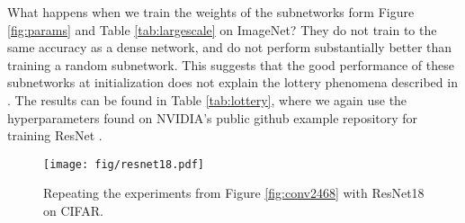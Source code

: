 \documentclass[10pt,twocolumn,letterpaper]{article}
\begin{document}
What happens when we train the weights of the subnetworks form Figure \ref{fig:params} and Table \ref{tab:largescale} on ImageNet? They do not train to the same accuracy as a dense network, and do not perform substantially better than training a random subnetwork. This suggests that the good performance of these subnetworks at initialization does not explain the lottery phenomena described in \cite{lth}. The results can be found in Table \ref{tab:lottery}, where we again use the hyperparameters found on NVIDIA's public github example repository for training ResNet \cite{repo}.

\begin{figure}[]
    \centering
    \texttt{[image: fig/resnet18.pdf]}
    \caption{Repeating the experiments from Figure \ref{fig:conv2468} with ResNet18 on CIFAR.}
    \label{fig:resnet18}
\end{figure}
\end{document}
